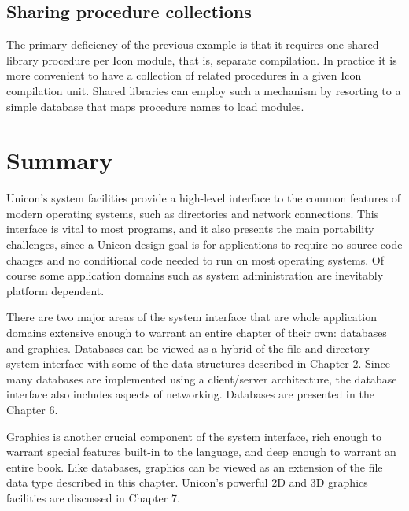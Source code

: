 
\subsection*{Sharing procedure collections}

The primary deficiency of the previous example is that it requires one
shared library procedure per Icon module, that is, separate
compilation. In practice it is more convenient to have a collection of
related procedures in a given Icon compilation unit. Shared libraries
can employ such a mechanism by resorting to a simple database that
maps procedure names to load modules.

\section{Summary}

Unicon's system facilities provide a high-level interface to the
common features of modern operating systems, such as directories and
network connections. This interface is vital to most programs, and it
also presents the main portability challenges, since a Unicon design
goal is for applications to require no source code
changes and no conditional code needed to run on most operating
systems. Of course some application domains such as system
administration are inevitably platform dependent.

There are two major areas of the system interface that are whole application
domains extensive enough to warrant an entire chapter of their own:
databases and graphics. Databases can be viewed as a hybrid of
the file and directory system interface with some of the data structures
described in Chapter 2. Since many databases are implemented using a
client/server architecture, the database interface also includes aspects of
networking. Databases are presented in the Chapter 6.

Graphics is another crucial component of the system interface, rich
enough to warrant special features built-in to the language, and deep
enough to warrant an entire book. Like databases, graphics can be
viewed as an extension of the file data type described in this
chapter.  Unicon's powerful 2D and 3D graphics facilities are
discussed in Chapter 7.


